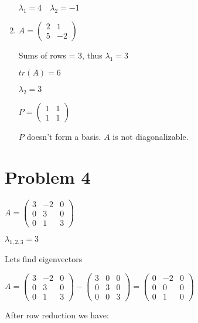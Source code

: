 \documentclass[12pt,letterpaper]{article}
\begin{document}
\begin{enumerate}[label=(\alph*)]
        $\lambda_1 = 4\quad\lambda_2 = -1$
    
    \item
    $A = \begin{pmatrix} 
            2 & 1 \\ 
            5 & -2 
        \end{pmatrix}$
        
    Sums of rows = 3, thus $\lambda_1 = 3$
    
    $tr(A) = 6$
    
    $\lambda_2 = 3$
    
    $P = \begin{pmatrix} 
            1 & 1 \\ 
            1 & 1 
        \end{pmatrix}$
        
    $P$ doesn't form a basis. $A$ is not diagonalizable.
\end{enumerate}

\section*{Problem 4}

 $A = \begin{pmatrix}
            3 & -2 & 0 \\
            0 & 3 & 0 \\
            0 & 1 & 3
        \end{pmatrix}$
        
$\lambda_{1, 2, 3} = 3$

Lets find eigenvectors

$A = \begin{pmatrix}
            3 & -2 & 0 \\
            0 & 3 & 0 \\
            0 & 1 & 3
        \end{pmatrix} - \begin{pmatrix}
            3 & 0 & 0 \\
            0 & 3 & 0 \\
            0 & 0 & 3
        \end{pmatrix} = \begin{pmatrix}
            0 & -2 & 0 \\
            0 & 0 & 0 \\
            0 & 1 & 0
        \end{pmatrix}$

After row reduction we have:
\end{document}
